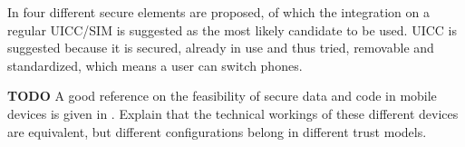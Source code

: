 




In \cite{Reveilhac:2009:PSE:1548884.1549404} four different secure elements are proposed, of which the integration on a regular UICC/SIM is suggested as the most likely candidate to be used.
UICC is suggested because it is secured, already in use and thus tried, removable and standardized, which means a user can switch phones. 

\textbf{TODO}
A good reference on the feasibility of secure data and code in mobile devices is given in \cite{Reveilhac:2009:PSE:1548884.1549404}.
Explain that the technical workings of these different devices are equivalent, but different configurations belong in different trust models.





